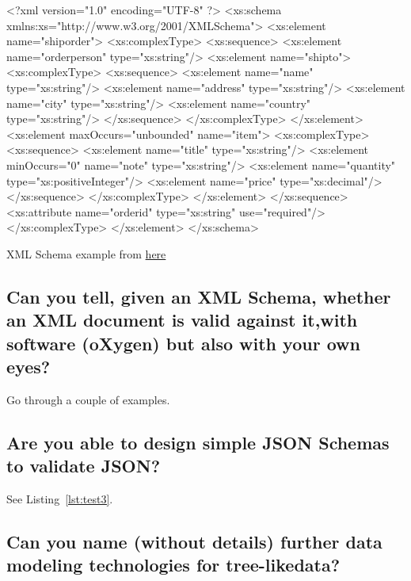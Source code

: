 \documentclass{article}
\begin{document}
\begin{center}
\begin{listing}[!ht]
  \begin{xml}
  <?xml version="1.0" encoding="UTF-8" ?>
  <xs:schema xmlns:xs="http://www.w3.org/2001/XMLSchema">
    <xs:element name="shiporder">
      <xs:complexType>
        <xs:sequence>
          <xs:element name="orderperson" type="xs:string"/>
          <xs:element name="shipto">
            <xs:complexType>
              <xs:sequence>
                <xs:element name="name" type="xs:string"/>
                <xs:element name="address" type="xs:string"/>
                <xs:element name="city" type="xs:string"/>
                <xs:element name="country" type="xs:string"/>
              </xs:sequence>
            </xs:complexType>
          </xs:element>
          <xs:element maxOccurs="unbounded" name="item">
            <xs:complexType>
              <xs:sequence>
                <xs:element name="title" type="xs:string"/>
                <xs:element minOccurs="0" name="note" type="xs:string"/>
                <xs:element name="quantity" type="xs:positiveInteger"/>
                <xs:element name="price" type="xs:decimal"/>
              </xs:sequence>
            </xs:complexType>
          </xs:element>
        </xs:sequence>
        <xs:attribute name="orderid" type="xs:string" use="required"/>
      </xs:complexType>
    </xs:element>
  </xs:schema>
  \end{xml}
  \caption[Test]{XML Schema example from \href{https://www.w3schools.com/xml/schema_example.asp}{here}}
  \label{lst:xmlschema}
\end{listing}
\end{center}

\subsection{Can you tell, given an XML Schema, whether an XML document is valid against it,with software (oXygen) but also with your own eyes?}

Go through a couple of examples.

\subsection{Are you able to design simple JSON Schemas to validate JSON?}

See Listing~\ref{lst:test3}.

\subsection{Can you name (without details) further data modeling technologies for tree-likedata?}
\end{document}
